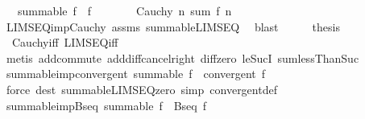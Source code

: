 \begin{isabellebody}
\ \ \ {\isachardoublequoteopen}summable\ f{\isachardoublequoteclose}\ \ {\isachardoublequoteopen}f\ {\isasymlonglonglongrightarrow}\ {}{\isachardoublequoteclose}\isanewline
%
\isadelimproof
%
\endisadelimproof
%
\isatagproof
{}\isamarkupfalse%
\ {\isacharminus}{\kern0pt}\isanewline
\ \ \isamarkupfalse%
\ {\isachardoublequoteopen}Cauchy\ {\isacharparenleft}{\kern0pt}{\isasymlambda}n{\isachardot}{\kern0pt}\ sum\ f\ {\isacharbraceleft}{\kern0pt}{\isachardot}{\kern0pt}{\isachardot}{\kern0pt}{\isacharless}{\kern0pt}n{\isacharbraceright}{\kern0pt}{\isacharparenright}{\kern0pt}{\isachardoublequoteclose}\isanewline
\ \ \ \ \isamarkupfalse%
\ LIMSEQ{\isacharunderscore}{\kern0pt}imp{\isacharunderscore}{\kern0pt}Cauchy\ assms\ summable{\isacharunderscore}{\kern0pt}LIMSEQ\ \isamarkupfalse%
\ blast\isanewline
\ \ \isamarkupfalse%
\ \isamarkupfalse%
\ {\isacharquery}{\kern0pt}thesis\isanewline
\ \ \ \ \isamarkupfalse%
\ \ Cauchy{\isacharunderscore}{\kern0pt}iff\ LIMSEQ{\isacharunderscore}{\kern0pt}iff\isanewline
\ \ \ \ \isamarkupfalse%
\ {\isacharparenleft}{\kern0pt}metis\ add{\isachardot}{\kern0pt}commute\ add{\isacharunderscore}{\kern0pt}diff{\isacharunderscore}{\kern0pt}cancel{\isacharunderscore}{\kern0pt}right{\isacharprime}{\kern0pt}\ diff{\isacharunderscore}{\kern0pt}zero\ le{\isacharunderscore}{\kern0pt}SucI\ sum{\isachardot}{\kern0pt}lessThan{\isacharunderscore}{\kern0pt}Suc{\isacharparenright}{\kern0pt}\isanewline
{}\isamarkupfalse%
%
\endisatagproof
{\isafoldproof}%
%
\isadelimproof
\isanewline
%
\endisadelimproof
\isanewline
{}\isamarkupfalse%
\ summable{\isacharunderscore}{\kern0pt}imp{\isacharunderscore}{\kern0pt}convergent{\isacharcolon}{\kern0pt}\ {\isachardoublequoteopen}summable\ f\ {\isasymLongrightarrow}\ convergent\ f{\isachardoublequoteclose}\isanewline
%
\isadelimproof
\ \ %
\endisadelimproof
%
\isatagproof
{}\isamarkupfalse%
\ {\isacharparenleft}{\kern0pt}force\ dest{\isacharbang}{\kern0pt}{\isacharcolon}{\kern0pt}\ summable{\isacharunderscore}{\kern0pt}LIMSEQ{\isacharunderscore}{\kern0pt}zero\ simp{\isacharcolon}{\kern0pt}\ convergent{\isacharunderscore}{\kern0pt}def{\isacharparenright}{\kern0pt}%
\endisatagproof
{\isafoldproof}%
%
\isadelimproof
\isanewline
%
\endisadelimproof
\isanewline
{}\isamarkupfalse%
\ summable{\isacharunderscore}{\kern0pt}imp{\isacharunderscore}{\kern0pt}Bseq{\isacharcolon}{\kern0pt}\ {\isachardoublequoteopen}summable\ f\ {\isasymLongrightarrow}\ Bseq\ f{\isachardoublequoteclose}\isanewline

\end{isabellebody}
